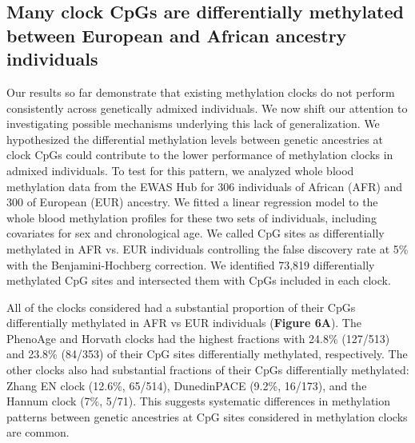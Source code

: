 \subsection{Many clock CpGs are differentially methylated between European and African ancestry individuals}
Our results so far demonstrate that existing methylation clocks do not perform consistently across genetically admixed individuals. We now shift our attention to investigating possible mechanisms underlying this lack of generalization. We hypothesized the differential methylation levels between genetic ancestries at clock CpGs could contribute to the lower performance of methylation clocks in admixed individuals. To test for this pattern, we analyzed whole blood methylation data from the EWAS Hub for 306 individuals of African (AFR) and 300 of European (EUR) ancestry. We fitted a linear regression model to the whole blood methylation profiles for these two sets of individuals, including covariates for sex and chronological age. We called CpG sites as differentially methylated in AFR vs. EUR individuals controlling the false discovery rate at 5\% with the Benjamini-Hochberg correction. We identified 73,819 differentially methylated CpG sites and intersected them with CpGs included in each clock.

All of the clocks considered had a substantial proportion of their CpGs differentially methylated in AFR vs EUR individuals (\textbf{Figure 6A}). The PhenoAge and Horvath clocks had the highest fractions with 24.8\% (127/513) and 23.8\% (84/353) of their CpG sites differentially methylated, respectively. The other clocks also had substantial fractions of their CpGs differentially methylated: Zhang EN clock (12.6\%, 65/514), DunedinPACE (9.2\%, 16/173), and the Hannum clock (7\%, 5/71). This suggests  systematic differences in methylation patterns between genetic ancestries at CpG sites considered in methylation clocks are common.


